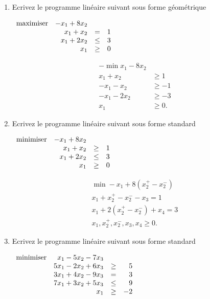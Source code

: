 \begin{enumerate}


  \item Ecrivez  le programme linéaire suivant sous forme géométrique

    $
    \begin{array}{lrcr}
      \mbox{maximiser} & -x_1 + 8 x_2 \\
      & x_1 + x_2 & = & 1\\
      & x_1 + 2x_2 & \leq & 3\\
      & x_1 & \geq & 0
    \end{array}
    $

    \begin{solution}
      \begin{align*}
        -\min x_{1}-8x_{2}\\
        x_{1} + x_{2} & \geq 1\\
        -x_{1} - x_{2} & \geq -1\\
        -x_{1} - 2x_{2} & \geq -3\\
        x_{1} & \geq 0.
      \end{align*}
    \end{solution}


  \item Ecrivez  le programme linéaire suivant sous forme standard

    $
    \begin{array}{lrcr}
      \mbox{minimiser} & -x_1 + 8 x_2 \\
      & x_1 + x_2 & \geq & 1\\
      & x_1 + 2x_2 & \leq & 3\\
      & x_1 & \geq & 0
    \end{array}
    $

    \begin{solution}
      \begin{align*}
        \min -x_{1} + 8(x_{2}^{+} - x_{2}^{-})\\
        x_{1} + x_{2}^{+} - x_{2}^{-} - x_{3} = 1\\
        x_{1} + 2(x_{2}^{+} - x_{2}^{-}) + x_{4} = 3\\
        x_{1},x_{2}^{+},x_{2}^{-},x_{3}, x_{4} \geq 0.
    \end{align*}
    \end{solution}


  \item Ecrivez  le programme linéaire suivant sous forme standard

    $
    \begin{array}{lrcr}
      \mbox{minimiser} & x_1-5x_2-7x_3\\
      & 5x_1-2x_2+6x_3  & \geq & 5\\
      &3x_1+4x_2-9x_3 & = & 3\\
      &7x_1+3x_2+ 5x_3 & \leq & 9\\
      & x_1  & \geq & -2\\
    \end{array}
    $


\end{enumerate}
